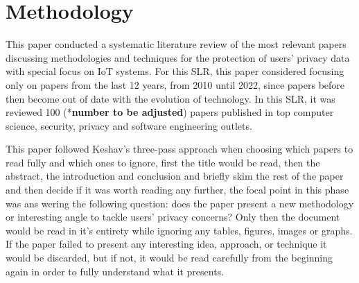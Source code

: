 \documentclass[conference]{IEEEtran}
\begin{document}

\section{Methodology}

This paper conducted a systematic literature review of the most relevant papers
discussing methodologies and techniques for the protection of users' privacy
data with special focus on IoT systems. For this SLR, this paper considered focusing
only on papers from the last 12 years, from 2010 until 2022, since papers before
then become out of date with the evolution of technology. In this SLR, it was reviewed 100
(*\textbf{\color{red}number to be adjusted}) papers published in top computer
science, security, privacy and software engineering outlets.

This paper followed Keshav's three-pass approach \cite{KeshavHow} when choosing which
papers to read fully and which ones to ignore, first the title would be read,
then the abstract, the introduction and conclusion and briefly skim the rest of the paper
and then decide if it was worth reading any further, the focal point in this
phase was ans wering the following question: does the paper present a new
methodology or interesting angle to tackle users' privacy concerns? Only then
the document would be read in it's entirety while ignoring any tables, figures,
images or graphs. If the paper failed to present any interesting idea, approach,
or technique it would be discarded, but if not, it would be read carefully
from the beginning again in order to fully understand what it presents.
\end{document}
